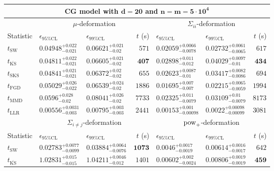 \begin{tabular}{l|llr|llr}
	\toprule
	\multicolumn{7}{c}{{\bf CG model with $\mathbf{d=20}$ and $\mathbf{n=m=5\cdot 10^{4}}$}} \\
	\toprule
	\multicolumn{1}{c}{} & \multicolumn{3}{c}{$\mu$-deformation} & \multicolumn{3}{c}{$\Sigma_{ii}$-deformation} \\
	Statistic & $\epsilon_{95\%\mathrm{CL}}$ & $\epsilon_{99\%\mathrm{CL}}$ & $t$ (s) & $\epsilon_{95\%\mathrm{CL}}$ & $\epsilon_{99\%\mathrm{CL}}$ & $t$ (s) \\
	\midrule
	$t_{\mathrm{SW}}$ & $0.04948_{-0.021}^{+0.022}$ & $0.06621_{-0.02}^{+0.021}$ & $571$ & $0.02059_{-0.0078}^{+0.0066}$ & $0.02732_{-0.0065}^{+0.0061}$ & $617$ \\
	$t_{\overline{\mathrm{KS}}}$ & ${\mathbf{0.04811_{-0.021}^{+0.022}}}$ & $0.06605_{-0.02}^{+0.021}$ & ${\mathbf{407}}$ & $0.02898_{-0.012}^{+0.011}$ & $0.04029_{-0.01}^{+0.0097}$ & ${\mathbf{434}}$ \\
	$t_{\mathrm{SKS}}$ & $0.04841_{-0.021}^{+0.021}$ & ${\mathbf{0.06372_{-0.02}^{+0.02}}}$ & $655$ & $0.02623_{-0.01}^{+0.0087}$ & $0.03417_{-0.0086}^{+0.0082}$ & $694$ \\
	$t_{\mathrm{FGD}}$ & $0.05029_{-0.022}^{+0.026}$ & $0.06539_{-0.02}^{+0.024}$ & $1886$ & ${\mathbf{0.01695_{-0.007}^{+0.007}}}$ & ${\mathbf{0.02215_{-0.0059}^{+0.0065}}}$ & $1994$ \\
	$t_{\mathrm{MMD}}$ & $0.0596_{-0.02}^{+0.028}$ & $0.08041_{-0.02}^{+0.026}$ & $7733$ & $0.02325_{-0.0079}^{+0.011}$ & $0.03109_{-0.0079}^{+0.01}$ & $8173$ \\
	$t_{\mathrm{LLR}}$ & $0.00556_{-0.003}^{+0.0031}$ & $0.00795_{-0.003}^{+0.003}$ & $2441$ & $0.00153_{-0.00098}^{+0.001}$ & $0.0022_{-0.00099}^{+0.00098}$ & $3081$ \\
	\toprule
	\multicolumn{1}{c}{} & \multicolumn{3}{c}{$\Sigma_{i\neq j}$-deformation} & \multicolumn{3}{c}{$\rm{pow}_{+}$-deformation} \\
	Statistic & $\epsilon_{95\%\mathrm{CL}}$ & $\epsilon_{99\%\mathrm{CL}}$ & $t$ (s) & $\epsilon_{95\%\mathrm{CL}}$ & $\epsilon_{99\%\mathrm{CL}}$ & $t$ (s) \\
	\midrule
	$t_{\mathrm{SW}}$ & $0.02783_{-0.0099}^{+0.0077}$ & $0.03884_{-0.0076}^{+0.0064}$ & ${\mathbf{1073}}$ & $0.0046_{-0.0019}^{+0.0017}$ & $0.00614_{-0.0017}^{+0.0016}$ & $642$ \\
	$t_{\overline{\mathrm{KS}}}$ & $1.02831_{-0.015}^{+0.015}$ & $1.04211_{-0.012}^{+0.0046}$ & $1401$ & $0.00602_{-0.0024}^{+0.002}$ & $0.00806_{-0.0019}^{+0.0019}$ & ${\mathbf{459}}$ \\

\end{tabular}
